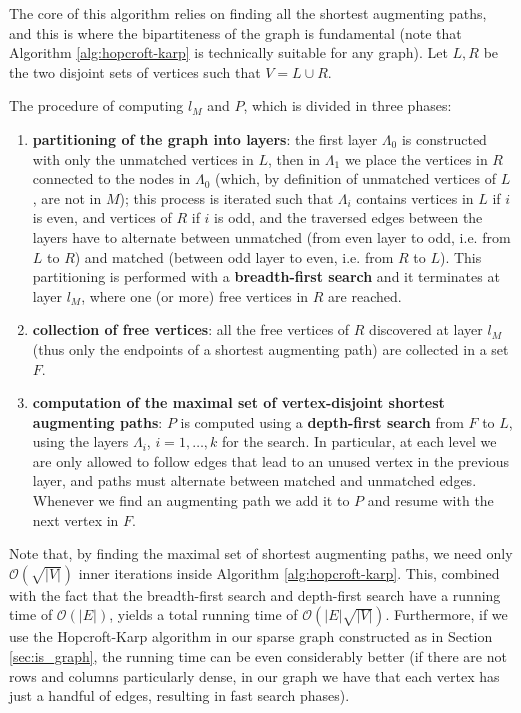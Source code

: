 The core of this algorithm relies on finding all the shortest augmenting paths, and this is where the bipartiteness of the graph is fundamental (note that Algorithm \ref{alg:hopcroft-karp} is technically suitable for any graph). Let $L,R$ be the two disjoint sets of vertices such that $V = L \cup R$.

The procedure of computing $l_M$ and $P$, which is divided in three phases:

\begin{enumerate}
	\item \textbf{partitioning of the graph into layers}: the first layer $\Lambda_0$ is constructed with only the unmatched vertices in $L$, then in $\Lambda_1$ we place the vertices in $R$ connected to the nodes in $\Lambda_0$ (which, by definition of unmatched vertices of $L$, are not in $M$); this process is iterated such that $\Lambda_i$ contains vertices in $L$ if $i$ is even, and vertices of $R$ if $i$ is odd, and the traversed edges between the layers have to alternate between unmatched (from even layer to odd, i.e. from $L$ to $R$) and matched (between odd layer to even, i.e. from $R$ to $L$). This partitioning is performed with a \textbf{breadth-first search} and it terminates at layer $l_M$, where one (or more) free vertices in $R$ are reached.
	\item \textbf{collection of free vertices}: all the free vertices of $R$ discovered at layer $l_M$ (thus only the endpoints of a shortest augmenting path) are collected in a set $F$.
	\item \textbf{computation of the maximal set of vertex-disjoint shortest augmenting paths}: $P$ is computed using a \textbf{depth-first search} from $F$ to $L$, using the layers $\Lambda_i$, $i=1,\dots,k$ for the search. In particular, at each level we are only allowed to follow edges that lead to an unused vertex in the previous layer, and paths must alternate between matched and unmatched edges. Whenever we find an augmenting path we add it to $P$ and resume with the next vertex in $F$.
\end{enumerate}

Note that, by finding the maximal set of shortest augmenting paths, we need only $\mathcal{O}\left( \sqrt{|V|} \right)$ inner iterations inside Algorithm \ref{alg:hopcroft-karp}. This, combined with the fact that the breadth-first search and depth-first search have a running time of $\mathcal{O}(|E|)$, yields a total running time of $\mathcal{O} \left( |E|\sqrt{|V|} \right)$.
Furthermore, if we use the Hopcroft-Karp algorithm in our sparse graph constructed as in Section \ref{sec:is_graph}, the running time can be even considerably better (if there are not rows and columns particularly dense, in our graph we have that each vertex has just a handful of edges, resulting in fast search phases).

